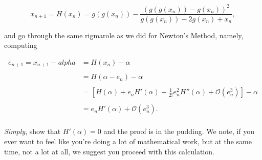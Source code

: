\documentclass[paper=a4, fontsize=11pt]{scrartcl} %
\numberwithin{equation}{section} %
\numberwithin{figure}{section} %
\numberwithin{table}{section} %
\begin{document}
$$x_{n+1} = H(x_n) = g(g(x_n)) - \frac{ ( g(g(x_n)) - g(x_n) )^2   }{ g(g(x_n)) - 2 g(x_n) + x_n   },$$

and go through the same rigmarole as we did for Newton's Method, namely, computing 

\begin{align*}
e_{n+1} = x_{n+1} -alpha &= H(x_n) - \alpha \\ \\
	&= H( \alpha - e_n ) - \alpha \\ \\
	&= \left[ H(\alpha) + e_n H'(\alpha) + \frac{1}{2!} e_n^2 H''(\alpha) + \mathcal{O}(e_{n}^3)   \right] - \alpha \\ \\
	&= e_n H'(\alpha) +  \mathcal{O}(e_{n}^3). \\ 
\end{align*}

\emph{Simply}, show that $H'(\alpha) = 0$ and the proof is in the pudding. We note, if you ever want to feel like you're doing a lot of mathematical work, but at the same time, not a lot at all, we suggest you proceed with this calculation. 
\end{document}
